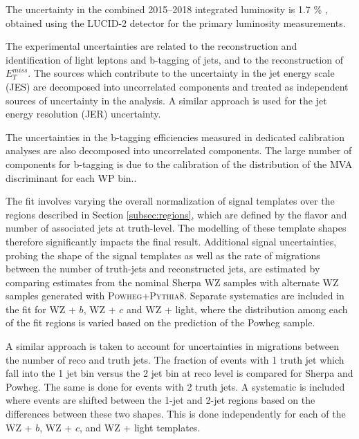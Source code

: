 
The uncertainty in the combined 2015--2018 integrated luminosity is 1.7 \% \cite{ATLAS-CONF-2019-021}, obtained using the LUCID-2 detector \cite{LUCID2} for the primary luminosity measurements.

The experimental uncertainties are related to the reconstruction and identification of light leptons and b-tagging of jets, and to the reconstruction of $E^{miss}_T$. The sources which contribute to the uncertainty in the jet energy scale (JES) \cite{jes} are decomposed into uncorrelated components and treated as independent sources of uncertainty in the analysis. A similar approach is used for the jet energy resolution (JER) uncertainty.

The uncertainties in the b-tagging efficiencies measured in dedicated calibration analyses \cite{btag_cal} are also decomposed into uncorrelated components. The large number of components for b-tagging is due to the calibration of the distribution of the MVA discriminant for each WP bin..  

The fit involves varying the overall normalization of signal templates over the regions described in Section \ref{subsec:regions}, which are defined by the flavor and number of associated jets at truth-level. The modelling of these template shapes therefore significantly impacts the final result. Additional signal uncertainties, probing the shape of the signal templates as well as the rate of migrations between the number of truth-jets and reconstructed jets, are estimated by comparing estimates from the nominal Sherpa WZ samples with alternate WZ samples generated with \textsc{Powheg}+\textsc{Pythia8}. Separate systematics are included in the fit for WZ + $b$, WZ + $c$ and WZ + light, where the distribution among each of the fit regions is varied based on the prediction of the Powheg sample.

A similar approach is taken to account for uncertainties in migrations between the number of reco and truth jets. The fraction of events with 1 truth jet which fall into the 1 jet bin versus the 2 jet bin at reco level is compared for Sherpa and Powheg. The same is done for events with 2 truth jets. A systematic is included where events are shifted between the 1-jet and 2-jet regions based on the differences between these two shapes. This is done independently for each of the WZ + $b$, WZ + $c$, and WZ + light templates.

